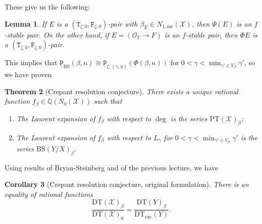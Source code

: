 \documentclass[leqno, openany]{memoir}
\newtheorem{thm}{Theorem}[section]
\newtheorem{cor}[thm]{Corollary}
\newtheorem{lem}[thm]{Lemma}
\theoremstyle{definition}
\theoremstyle{remark}
\theoremstyle{plain}
\theoremstyle{definition}
\theoremstyle{remark}
\newcommand{\Q}{\mathbb{Q}}
\newcommand{\mc}[1]{\mathcal{#1}}
\newcommand{\mr}[1]{\mathrm{#1}}
\newcommand{\mt}[1]{\mathtt{#1}}
\newcommand{\ul}[1]{\underline{#1}}
\begin{document}
These give us the following:
\begin{lem}
    If $E$ is a $(\mt{T}_{\zeta, 0}, \mt{F}_{\zeta, 0})$-pair with $\beta_E \in N_{1,\mr{mr}}(\mc{X})$, then $\Psi(E)$ is an $f$-stable pair. On the other hand, if $E = (\mc{O}_Y \to F)$ is an $f$-stable pair, then $\Phi E$ is a $(\mt{T}_{\zeta, 0}, \mt{F}_{\zeta, 0})$-pair.
\end{lem}

This implies that $\mt{\ul{P}}_{\mr{BS}}(\beta, n) \cong \mt{\ul{P}}_{\zeta, (\gamma,\eta)}(\Phi(\beta, n))$ for $0 < \gamma < \min_{\gamma' \in V_{\beta}} \gamma'$, so we have proven

\begin{thm}[Crepant resolution conjecture]
    There exists a unique rational function $f_{\beta} \in \Q(N_0(\mc{X}))$ such that
    \begin{enumerate}
        \item The Laurent expansion of $f_{\beta}$ with respect to $\deg$ is the series $\mr{PT}(\mc{X})_{\beta}$;
        \item The Laurent expansion of $f_{\beta}$ with respect to $L_{\gamma}$ for $0 < \gamma < \min_{\gamma' \in V_{\beta}} \gamma'$ is the series $\mr{BS}(Y/X)_{\beta}$.
    \end{enumerate}
\end{thm}

Using results of Bryan-Steinberg and of the previous lecture, we have

\begin{cor}[Crepant resolution conjecture, original formulation]
    There is an equality of rational functions
    \[ \frac{\mr{DT}(\mc{X})_{\beta}}{\mr{DT}(\mc{X})_0} = \frac{\mr{DT}(Y)_{\beta}}{\mr{DT}_{\mr{exc}}(Y)}. \]
\end{cor}
\end{document}

